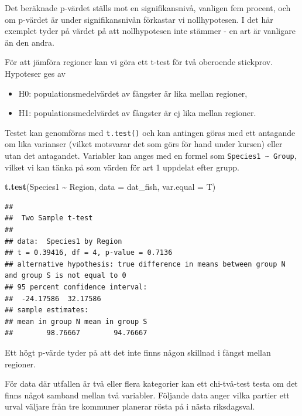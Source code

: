\documentclass[
]{book}
\newenvironment{Shaded}{\begin{snugshade}}{\end{snugshade}}
\newcommand{\AttributeTok}[1]{\textcolor[rgb]{0.13,0.29,0.53}{#1}}
\newcommand{\FunctionTok}[1]{\textcolor[rgb]{0.13,0.29,0.53}{\textbf{#1}}}
\newcommand{\NormalTok}[1]{#1}
\newcommand{\SpecialCharTok}[1]{\textcolor[rgb]{0.81,0.36,0.00}{\textbf{#1}}}
\providecommand{\tightlist}{%
  \setlength{\itemsep}{0pt}\setlength{\parskip}{0pt}}
\theoremstyle{definition}
\theoremstyle{definition}
\theoremstyle{definition}
\theoremstyle{definition}
\theoremstyle{remark}
\begin{document}
Det beräknade p-värdet ställs mot en signifikansnivå, vanligen fem procent, och om p-värdet är under signifikansnivån förkastar vi nollhypotesen. I det här exemplet tyder på värdet på att nollhypotesen inte stämmer - en art är vanligare än den andra.

För att jämföra regioner kan vi göra ett t-test för två oberoende stickprov. Hypoteser ges av

\begin{itemize}
\tightlist
\item
  H0: populationsmedelvärdet av fångster är lika mellan regioner,
\item
  H1: populationsmedelvärdet av fångster är ej lika mellan regioner.
\end{itemize}

Testet kan genomföras med \texttt{t.test()} och kan antingen göras med ett antagande om lika varianser (vilket motsvarar det som görs för hand under kursen) eller utan det antagandet. Variabler kan anges med en formel som \texttt{Species1\ \textasciitilde{}\ Group}, vilket vi kan tänka på som värden för art 1 uppdelat efter grupp.

\begin{Shaded}
\begin{Highlighting}[]
\FunctionTok{t.test}\NormalTok{(Species1 }\SpecialCharTok{\textasciitilde{}}\NormalTok{ Region, }\AttributeTok{data =}\NormalTok{ dat\_fish, }\AttributeTok{var.equal =}\NormalTok{ T)}
\end{Highlighting}
\end{Shaded}

\begin{verbatim}
## 
##  Two Sample t-test
## 
## data:  Species1 by Region
## t = 0.39416, df = 4, p-value = 0.7136
## alternative hypothesis: true difference in means between group N and group S is not equal to 0
## 95 percent confidence interval:
##  -24.17586  32.17586
## sample estimates:
## mean in group N mean in group S 
##        98.76667        94.76667
\end{verbatim}

Ett högt p-värde tyder på att det inte finns någon skillnad i fångst mellan regioner.

För data där utfallen är två eller flera kategorier kan ett chi-två-test testa om det finns något samband mellan två variabler. Följande data anger vilka partier ett urval väljare från tre kommuner planerar rösta på i nästa riksdagsval.
\end{document}
